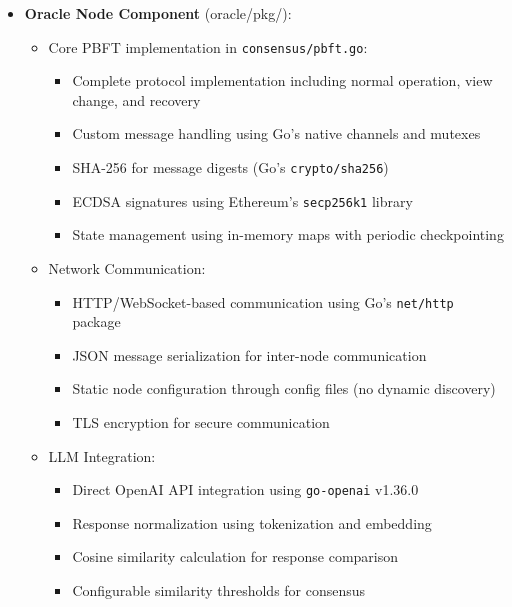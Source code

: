 \documentclass[12pt]{article}
\begin{document}
\begin{itemize}
    \item \textbf{Oracle Node Component} (oracle/pkg/):
    \begin{itemize}
        \item Core PBFT implementation in \texttt{consensus/pbft.go}:
        \begin{itemize}
            \item Complete protocol implementation including normal operation, view change, and recovery
            \item Custom message handling using Go's native channels and mutexes
            \item SHA-256 for message digests (Go's \texttt{crypto/sha256})
            \item ECDSA signatures using Ethereum's \texttt{secp256k1} library
            \item State management using in-memory maps with periodic checkpointing
        \end{itemize}

        \item Network Communication:
        \begin{itemize}
            \item HTTP/WebSocket-based communication using Go's \texttt{net/http} package
            \item JSON message serialization for inter-node communication
            \item Static node configuration through config files (no dynamic discovery)
            \item TLS encryption for secure communication
        \end{itemize}

        \item LLM Integration:
        \begin{itemize}
            \item Direct OpenAI API integration using \texttt{go-openai} v1.36.0
            \item Response normalization using tokenization and embedding
            \item Cosine similarity calculation for response comparison
            \item Configurable similarity thresholds for consensus
        \end{itemize}
    \end{itemize}


\end{itemize}
\end{document}
